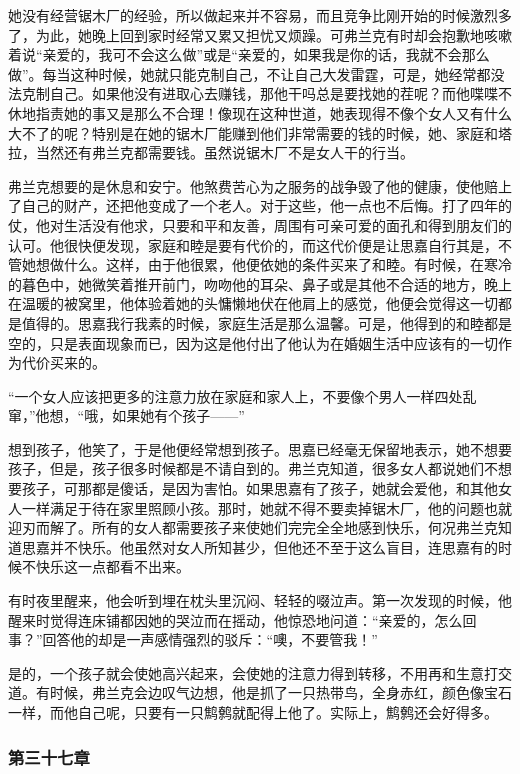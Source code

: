 \par 她没有经营锯木厂的经验，所以做起来并不容易，而且竞争比刚开始的时候激烈多了，为此，她晚上回到家时经常又累又担忧又烦躁。可弗兰克有时却会抱歉地咳嗽着说“亲爱的，我可不会这么做”或是“亲爱的，如果我是你的话，我就不会那么做”。每当这种时候，她就只能克制自己，不让自己大发雷霆，可是，她经常都没法克制自己。如果他没有进取心去赚钱，那他干吗总是要找她的茬呢？而他喋喋不休地指责她的事又是那么不合理！像现在这种世道，她表现得不像个女人又有什么大不了的呢？特别是在她的锯木厂能赚到他们非常需要的钱的时候，她、家庭和塔拉，当然还有弗兰克都需要钱。虽然说锯木厂不是女人干的行当。
\par 弗兰克想要的是休息和安宁。他煞费苦心为之服务的战争毁了他的健康，使他赔上了自己的财产，还把他变成了一个老人。对于这些，他一点也不后悔。打了四年的仗，他对生活没有他求，只要和平和友善，周围有可亲可爱的面孔和得到朋友们的认可。他很快便发现，家庭和睦是要有代价的，而这代价便是让思嘉自行其是，不管她想做什么。这样，由于他很累，他便依她的条件买来了和睦。有时候，在寒冷的暮色中，她微笑着推开前门，吻吻他的耳朵、鼻子或是其他不合适的地方，晚上在温暖的被窝里，他体验着她的头慵懒地伏在他肩上的感觉，他便会觉得这一切都是值得的。思嘉我行我素的时候，家庭生活是那么温馨。可是，他得到的和睦都是空的，只是表面现象而已，因为这是他付出了他认为在婚姻生活中应该有的一切作为代价买来的。
\par “一个女人应该把更多的注意力放在家庭和家人上，不要像个男人一样四处乱窜，”他想，“哦，如果她有个孩子——”
\par 想到孩子，他笑了，于是他便经常想到孩子。思嘉已经毫无保留地表示，她不想要孩子，但是，孩子很多时候都是不请自到的。弗兰克知道，很多女人都说她们不想要孩子，可那都是傻话，是因为害怕。如果思嘉有了孩子，她就会爱他，和其他女人一样满足于待在家里照顾小孩。那时，她就不得不要卖掉锯木厂，他的问题也就迎刃而解了。所有的女人都需要孩子来使她们完完全全地感到快乐，何况弗兰克知道思嘉并不快乐。他虽然对女人所知甚少，但他还不至于这么盲目，连思嘉有的时候不快乐这一点都看不出来。
\par 有时夜里醒来，他会听到埋在枕头里沉闷、轻轻的啜泣声。第一次发现的时候，他醒来时觉得连床铺都因她的哭泣而在摇动，他惊恐地问道：“亲爱的，怎么回事？”回答他的却是一声感情强烈的驳斥：“噢，不要管我！”
\par 是的，一个孩子就会使她高兴起来，会使她的注意力得到转移，不用再和生意打交道。有时候，弗兰克会边叹气边想，他是抓了一只热带鸟，全身赤红，颜色像宝石一样，而他自己呢，只要有一只鹪鹩就配得上他了。实际上，鹪鹩还会好得多。

\subsubsection{第三十七章}

